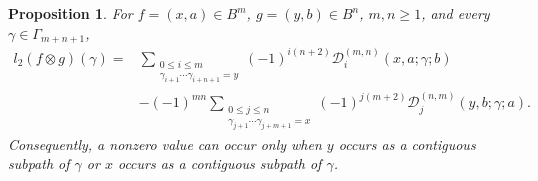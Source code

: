 \documentclass[11pt,a4paper,reqno]{amsart}
\newcommand{\mD}{\mathcal D}
\newcommand{\para}[2]{(#1,#2)}
\theoremstyle{plain}
\newtheorem{proposition}[proposition]{Proposition}
\theoremstyle{definition}
\numberwithin{equation}{section}
\begin{document}
	\begin{proposition}\label{HOBF}
		For $f=\para{x}{a}\in B^m$, $g=\para{y}{b}\in B^n$, $m,n\geq1$, and every
		$\gamma\in\Gamma_{m+n+1}$,
		\begin{align*}
			l_2(f\otimes g)(\gamma)
			={}&\sum_{\substack{0\leq i\leq m\\
					\gamma_{i+1}\cdots\gamma_{i+n+1}=y}}
			(-1)^{i(n+2)}
			\mD_i^{(m,n)}(x,a;\gamma;b)\\
			&-(-1)^{mn}
			\sum_{\substack{0\leq j\leq n\\
					\gamma_{j+1}\cdots\gamma_{j+m+1}=x}}
			(-1)^{j(m+2)}
			\mD_j^{(n,m)}(y,b;\gamma;a).
		\end{align*}
		Consequently, a nonzero value can occur only when $y$ occurs as a contiguous
		subpath of $\gamma$ or $x$ occurs as a contiguous subpath of $\gamma$.
	\end{proposition}
	
\end{document}
